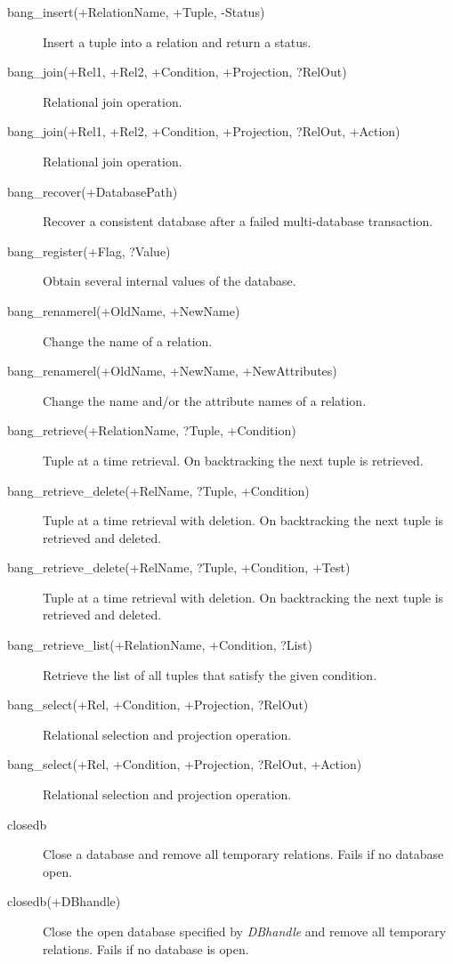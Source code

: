 \begin{description}
\item[bang_insert(+RelationName, +Tuple, -Status)]{Insert a tuple into a relation and return a status.}
\item[bang_join(+Rel1, +Rel2, +Condition, +Projection, ?RelOut)]{Relational join operation.}
\item[bang_join(+Rel1, +Rel2, +Condition, +Projection, ?RelOut, +Action)]{Relational join operation.}
\item[bang_recover(+DatabasePath)]{Recover a consistent database after a failed multi-database transaction.}
\item[bang_register(+Flag, ?Value)]{Obtain several internal values of the database.}
\item[bang_renamerel(+OldName, +NewName)]{Change the name of a relation.}
\item[bang_renamerel(+OldName, +NewName, +NewAttributes)]{Change the name and/or the attribute names of a relation.}
\item[bang_retrieve(+RelationName, ?Tuple, +Condition)]{Tuple at a time retrieval. On backtracking the next tuple is retrieved.}
\item[bang_retrieve_delete(+RelName, ?Tuple, +Condition)]{Tuple at a time retrieval with deletion. On backtracking the next tuple is retrieved and deleted.}
\item[bang_retrieve_delete(+RelName, ?Tuple, +Condition, +Test)]{Tuple at a time retrieval with deletion. On backtracking the next tuple is retrieved and deleted.}
\item[bang_retrieve_list(+RelationName, +Condition, ?List)]{Retrieve the list of all tuples that satisfy the given condition.}
\item[bang_select(+Rel, +Condition, +Projection, ?RelOut)]{Relational selection and projection operation.}
\item[bang_select(+Rel, +Condition, +Projection, ?RelOut, +Action)]{Relational selection and projection operation.}
\item[closedb]{Close a database and remove all temporary relations. Fails if no database open.}
\item[closedb(+DBhandle)]{Close the open database specified by {\it DBhandle} and remove all temporary relations. Fails if no database is open.}

\end{description}
